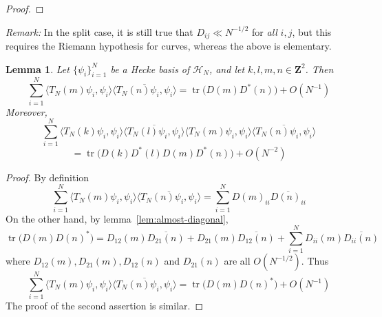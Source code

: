 \documentclass[12pt]{amsart}
\newtheorem{lem}[thm]{Lemma}%
\theoremstyle{plain}
\newcommand{\Z}{{\mathbf Z}}
\newcommand{\trace}{\operatorname{tr}}
\newcommand{\T}{\TN}
\newcommand{\TN}{T_N}  %
\newcommand{\HN}{\mathcal H_N}
\renewcommand{\^}{\widehat}
\begin{document}
\begin{proof}
%
\end{proof}

{\em Remark:}  In the split case, it is still true that $D_{ij} \ll
N^{-1/2}$ for {\em all} $i,j$, but this requires the Riemann
hypothesis for curves, whereas the above is elementary.

\begin{lem}
\label{lem:product-as-trace}
Let $\{\psi_i\}_{i=1}^N$ be a Hecke basis of $\HN$, and let $k,l,m,n
\in \Z^2$.  Then
$$
\sum_{i=1}^N
\langle \T(m) \psi_i, \psi_i \rangle  
\overline{\langle \T(n) \psi_i, \psi_i \rangle  }
=
\trace \big( D(m) D^*(n) \big)
+O(N^{-1})
$$
Moreover,
$$
\sum_{i=1}^N
\langle \T(k) \psi_i, \psi_i \rangle  
\overline{\langle \T(l) \psi_i, \psi_i \rangle  }
\langle \T(m) \psi_i, \psi_i \rangle  
\overline{\langle \T(n) \psi_i, \psi_i \rangle  }
$$
$$
=
\trace \big( D(k) D^*(l) D(m) D^*(n) \big)
+O(N^{-2})
$$
\end{lem}

\begin{proof}
By definition
$$
\sum_{i=1}^N
\langle \T(m) \psi_i, \psi_i \rangle  
\overline{\langle \T(n) \psi_i, \psi_i \rangle  }
= 
\sum_{i=1}^N
D(m)_{ii}
\overline{D(n)_{ii}}
$$
%
On the other hand, by lemma~\ref{lem:almost-diagonal},
$$
\trace \big( D(m) D(n)^* \big)
=
D_{12}(m) \overline{D_{21}(n)} +
D_{21}(m) \overline{D_{12}(n)} +
\sum_{i=1}^N
D_{ii}(m)
\overline{D_{ii}(n)}
$$
where $D_{12}(m), D_{21}(m), D_{12}(n)$ and $D_{21}(n)$ are all
$O(N^{-1/2})$.  Thus 
$$
\sum_{i=1}^N
\langle \T(m) \psi_i, \psi_i \rangle  
\overline{\langle \T(n) \psi_i, \psi_i \rangle  }
=
\trace \big( D(m) D(n)^* \big)
+O(N^{-1})
$$
The proof of the second assertion is similar.  
\end{proof}
\end{document}

